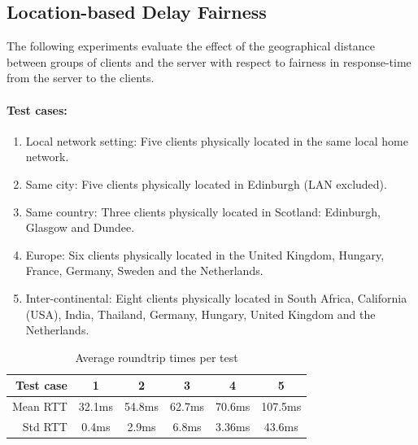 \documentclass[bsc,frontabs,twoside,singlespacing,parskip,deptreport]{infthesis}     %
\begin{document}
\subsection{Location-based Delay Fairness}
The following experiments evaluate the effect of the geographical distance between groups of clients and the server with respect to fairness in response-time from the server to the clients.

\paragraph*{Test cases:}
\begin{enumerate}
\item Local network setting: Five clients physically located in the same local home network.

\item Same city: Five clients physically located in Edinburgh (LAN excluded).

\item Same country: Three clients physically located in Scotland: Edinburgh, Glasgow and Dundee.

\item Europe: Six clients physically located in the United Kingdom, Hungary, France, Germany, Sweden and the Netherlands.

\item Inter-continental: Eight clients physically located in South Africa, California (USA), India, Thailand, Germany, Hungary, United Kingdom and the Netherlands.
\end{enumerate}

\begin{table}[H]
\centering
  \begin{tabular}{ | r || c | c | c | c | c |}
    \hline
    Test case 		& 1 		& 2 		& 3 		& 4 		& 5 		\\ \hline\hline
    Mean RTT 		& 32.1ms 	& 54.8ms 	& 62.7ms 	& 70.6ms 	& 107.5ms	\\ \hline
    Std RTT			& 0.4ms		& 2.9ms		& 6.8ms		& 3.36ms	& 43.6ms	\\ \hline
  \end{tabular}
  \caption{Average roundtrip times per test}
  \label{table:geo_avg_roundtrip}
\end{table}
\end{document}
